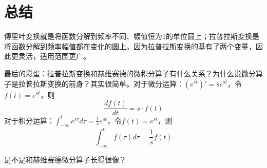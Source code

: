 \documentclass[lang=cn,11pt,a4paper,cite=numbers]{elegantpaper}
\begin{document}
\section{总结}
  傅里叶变换就是将函数分解到频率不同、幅值恒为1的单位圆上；拉普拉斯变换是将函数分解到频率幅值都在变化的圆上。因为拉普拉斯变换的基有了两个变量，因此更灵活，适用范围更广。

  最后的彩蛋：拉普拉斯变换和赫维赛德的微积分算子有什么关系？为什么说微分算子是拉普拉斯变换的前身？其实很简单。对于微分运算：$(e^{st})'=se^{st}$，令$f(t)=e^{st}$，则
\begin{equation}
  \frac{df(t)}{dt}=s{\cdot}f(t)
\end{equation}
对于积分运算：$\int_{-\infty}^{t}e^{s\tau}d\tau=\frac{1}{s}e^{st}$，令$f(t)=e^{st}$，则
\begin{equation}
  \int_{-\infty}^{t}f(\tau)d\tau=\frac{1}{s}f(t)
\end{equation}

  是不是和赫维赛德微分算子长得很像？

\nocite{*}

\end{document}
